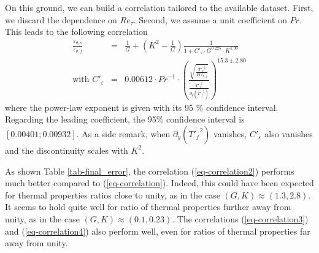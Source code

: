 \documentclass{svjour3}                     %
\begin{document}
On this ground, we can build a correlation tailored to the available dataset.
First, we discard the dependence on $Re_\tau$.
Second, we assume a unit coefficient on $Pr$.
This leads to the following correlation
\begin{eqnarray}
\frac{\varepsilon_{\theta,s}}{\varepsilon_{\theta,f}} & = & \frac{1}{G} + \left( K^2 - \frac{1}{G} \right) \frac{1}{1+C'_\varepsilon \cdot G^{0.225} \cdot K ^{1.90}} \label{eq-correlation4} \\
\mbox{with } C'_\varepsilon & = & 0.00612 \cdot {Pr}^{-1} \cdot \left( \frac{\sqrt{\frac{\overline{{T'_f}^2}}{Pr \varepsilon_{\theta,f}}}}{\frac{\overline{{T'_f}^2}}{\partial_y \left( \overline{{T'_f}^2} \right)}} \right)^{15.3 \pm 2.80} \nonumber
\end{eqnarray}
where the power-law exponent is given with its 95 \% confidence interval.
Regarding the leading coefficient, the 95\% confidence interval is $\left[ 0.00401; 0.00932\right]$.
As a side remark, when $\partial_y \left( \overline{{T'_f}^2} \right)$ vanishes, $C'_\varepsilon$ also vanishes and the discontinuity scales with $K^2$.

As shown Table \ref{tab-final_error}, the correlation (\ref{eq-correlation2}) performs much better compared to (\ref{eq-correlation}).
Indeed, this could have been expected for thermal properties ratios close to unity, as in the case $(G,K) \approx (1.3,2.8)$.
It seems to hold quite well for ratio of thermal properties further away from unity, as in the case $(G,K) \approx (0.1,0.23)$.
The correlations (\ref{eq-correlation3}) and (\ref{eq-correlation4}) also perform well, even for ratios of thermal properties far away from unity.
\end{document}

